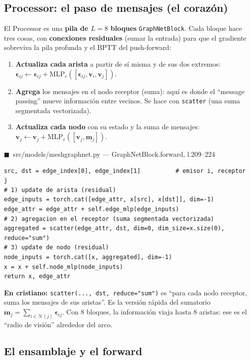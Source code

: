 \documentclass[11pt]{article}
\theoremstyle{definition}
\theoremstyle{plain}
\newcommand{\dummies}[1]{%
  \par\smallskip\noindent
  \colorbox{yellow!18}{\parbox{\dimexpr\linewidth-2\fboxsep}{%
  \small\textbf{En cristiano:} #1}}\par\smallskip}
\newcommand{\srcref}[1]{\par\smallskip\noindent
  {\footnotesize\ttfamily\textcolor{srcblue}{$\blacksquare$\ #1}}\par\vspace{1pt}}
\begin{document}
\subsection{Processor: el paso de mensajes (el corazón)}

El Processor es una \textbf{pila de $L=8$ bloques} \texttt{GraphNetBlock}. Cada
bloque hace tres cosas, con \textbf{conexiones residuales} (sumar la entrada) para
que el gradiente sobreviva la pila profunda y el BPTT del push-forward:

\begin{enumerate}[leftmargin=1.4em]
  \item \textbf{Actualiza cada arista} a partir de sí misma y de sus dos extremos:
  $\bm\epsilon_{ij}\leftarrow\bm\epsilon_{ij}+\mathrm{MLP}_e([\bm\epsilon_{ij},\bm v_i,\bm v_j])$.
  \item \textbf{Agrega} los mensajes en el nodo receptor (suma): aquí es donde el
  ``message passing'' mueve información entre vecinos. Se hace con
  \texttt{scatter} (una suma segmentada vectorizada).
  \item \textbf{Actualiza cada nodo} con su estado y la suma de mensajes:
  $\bm v_j\leftarrow\bm v_j+\mathrm{MLP}_v([\bm v_j,\bm m_j])$.
\end{enumerate}

\srcref{src/models/meshgraphnet.py — GraphNetBlock.forward, l.209--224}
\begin{lstlisting}
src, dst = edge_index[0], edge_index[1]          # emisor i, receptor j
# 1) update de arista (residual)
edge_inputs = torch.cat([edge_attr, x[src], x[dst]], dim=-1)
edge_attr = edge_attr + self.edge_mlp(edge_inputs)
# 2) agregacion en el receptor (suma segmentada vectorizada)
aggregated = scatter(edge_attr, dst, dim=0, dim_size=x.size(0), reduce="sum")
# 3) update de nodo (residual)
node_inputs = torch.cat([x, aggregated], dim=-1)
x = x + self.node_mlp(node_inputs)
return x, edge_attr
\end{lstlisting}

\dummies{\texttt{scatter(..., dst, reduce="sum")} es ``para cada nodo receptor,
suma los mensajes de sus aristas''. Es la versión rápida del sumatorio
$\bm m_j=\sum_{i\in\mathcal N(j)}\bm\epsilon_{ij}$. Con 8 bloques, la información
viaja hasta 8 aristas: ese es el ``radio de visión'' alrededor del arco.}

\subsection{El ensamblaje y el forward}
\end{document}
